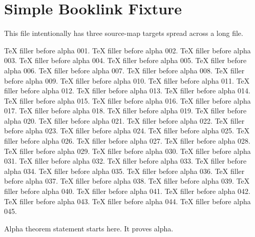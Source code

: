 \section{Simple Booklink Fixture}

This file intentionally has three source-map targets spread across a long file.

TeX filler before alpha 001.
TeX filler before alpha 002.
TeX filler before alpha 003.
TeX filler before alpha 004.
TeX filler before alpha 005.
TeX filler before alpha 006.
TeX filler before alpha 007.
TeX filler before alpha 008.
TeX filler before alpha 009.
TeX filler before alpha 010.
TeX filler before alpha 011.
TeX filler before alpha 012.
TeX filler before alpha 013.
TeX filler before alpha 014.
TeX filler before alpha 015.
TeX filler before alpha 016.
TeX filler before alpha 017.
TeX filler before alpha 018.
TeX filler before alpha 019.
TeX filler before alpha 020.
TeX filler before alpha 021.
TeX filler before alpha 022.
TeX filler before alpha 023.
TeX filler before alpha 024.
TeX filler before alpha 025.
TeX filler before alpha 026.
TeX filler before alpha 027.
TeX filler before alpha 028.
TeX filler before alpha 029.
TeX filler before alpha 030.
TeX filler before alpha 031.
TeX filler before alpha 032.
TeX filler before alpha 033.
TeX filler before alpha 034.
TeX filler before alpha 035.
TeX filler before alpha 036.
TeX filler before alpha 037.
TeX filler before alpha 038.
TeX filler before alpha 039.
TeX filler before alpha 040.
TeX filler before alpha 041.
TeX filler before alpha 042.
TeX filler before alpha 043.
TeX filler before alpha 044.
TeX filler before alpha 045.

\begin{theorem*}
Alpha theorem statement starts here.
It proves alpha.
\end{theorem*}

